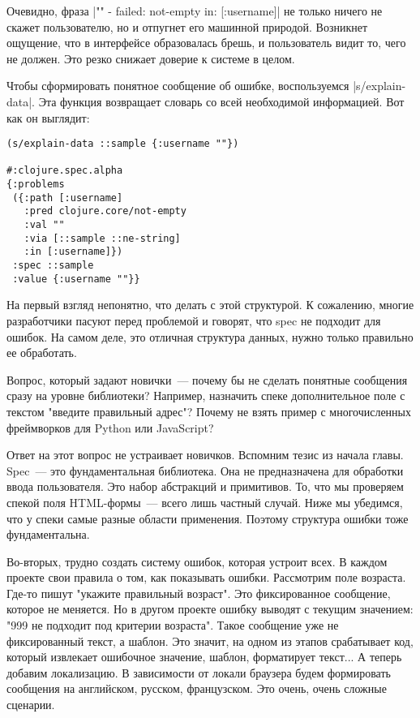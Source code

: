 Очевидно, фраза \spverb|"" - failed: not-empty in: [:username]| не только ничего не
скажет пользователю, но и отпугнет его машинной природой. Возникнет ощущение,
что в интерфейсе образовалась брешь, и пользователь видит то, чего не
должен. Это резко снижает доверие к системе в целом.

Чтобы сформировать понятное сообщение об ошибке, воспользуемся
\spverb|s/explain-data|. Эта функция возвращает словарь со всей необходимой
информацией. Вот как он выглядит:

\begin{verbatim}
(s/explain-data ::sample {:username ""})

#:clojure.spec.alpha
{:problems
 ({:path [:username]
   :pred clojure.core/not-empty
   :val ""
   :via [::sample ::ne-string]
   :in [:username]})
 :spec ::sample
 :value {:username ""}}
\end{verbatim}

На первый взгляд непонятно, что делать с этой структурой. К сожалению, многие
разработчики пасуют перед проблемой и говорят, что spec не подходит для
ошибок. На самом деле, это отличная структура данных, нужно только правильно ее
обработать.

Вопрос, который задают новички~--- почему бы не сделать понятные сообщения сразу
на уровне библиотеки? Например, назначить спеке дополнительное поле с текстом
"введите правильный адрес"? Почему не взять пример с многочисленных фреймворков
для Python или JavaScript?

Ответ на этот вопрос не устраивает новичков. Вспомним тезис из начала
главы. Spec~--- это фундаментальная библиотека. Она не предназначена для обработки
ввода пользователя. Это набор абстракций и примитивов. То, что мы проверяем
спекой поля HTML-формы~--- всего лишь частный случай. Ниже мы убедимся, что у
спеки самые разные области применения. Поэтому структура ошибки тоже
фундаментальна.

Во-вторых, трудно создать систему ошибок, которая устроит всех. В каждом проекте
свои правила о том, как показывать ошибки. Рассмотрим поле возраста. Где-то
пишут "укажите правильный возраст". Это фиксированное сообщение, которое не
меняется. Но в другом проекте ошибку выводят с текущим значением: "999 не
подходит под критерии возраста". Такое сообщение уже не фиксированный текст, а
шаблон. Это значит, на одном из этапов срабатывает код, который извлекает
ошибочное значение, шаблон, форматирует текст... А теперь добавим локализацию. В
зависимости от локали браузера будем формировать сообщения на английском,
русском, французском. Это очень, очень сложные сценарии.

